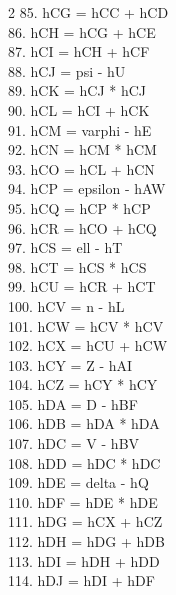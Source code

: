 \documentclass[10pt]{article}
\begin{document}
\begin{multicols}{2}
85. hCG = hCC + hCD\\
86. hCH = hCG + hCE\\
87. hCI = hCH + hCF\\
88. hCJ = psi - hU\\
89. hCK = hCJ * hCJ\\
90. hCL = hCI + hCK\\
91. hCM = varphi - hE\\
92. hCN = hCM * hCM\\
93. hCO = hCL + hCN\\
94. hCP = epsilon - hAW\\
95. hCQ = hCP * hCP\\
96. hCR = hCO + hCQ\\
97. hCS = ell - hT\\
98. hCT = hCS * hCS\\
99. hCU = hCR + hCT\\
100. hCV = n - hL\\
101. hCW = hCV * hCV\\
102. hCX = hCU + hCW\\
103. hCY = Z - hAI\\
104. hCZ = hCY * hCY\\
105. hDA = D - hBF\\
106. hDB = hDA * hDA\\
107. hDC = V - hBV\\
108. hDD = hDC * hDC\\
109. hDE = delta - hQ\\
110. hDF = hDE * hDE\\
111. hDG = hCX + hCZ\\
112. hDH = hDG + hDB\\
113. hDI = hDH + hDD\\
114. hDJ = hDI + hDF\\

\end{multicols}
\end{document}
